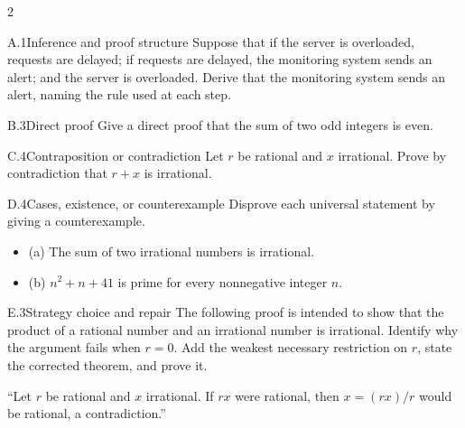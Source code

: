 \documentclass[9pt]{extarticle}
\begin{document}
\begin{multicols}{2}
\begin{CoreProblem}{A.1}{Inference and proof structure}
Suppose that if the server is overloaded, requests are delayed; if requests are
delayed, the monitoring system sends an alert; and the server is overloaded.
Derive that the monitoring system sends an alert, naming the rule used at each
step.
\end{CoreProblem}
\begin{CoreProblem}{B.3}{Direct proof}
Give a direct proof that the sum of two odd integers is even.
\end{CoreProblem}
\begin{CoreProblem}{C.4}{Contraposition or contradiction}
Let $r$ be rational and $x$ irrational. Prove by contradiction that $r+x$ is irrational.
\end{CoreProblem}
\columnbreak
\begin{CoreProblem}{D.4}{Cases, existence, or counterexample}
Disprove each universal statement by giving a counterexample.
\begin{itemize}
  \item (a) The sum of two irrational numbers is irrational.
  \item (b) $n^2+n+41$ is prime for every nonnegative integer $n$.
\end{itemize}
\end{CoreProblem}
\begin{CoreProblem}{E.3}{Strategy choice and repair}
The following proof is intended to show that the product of a rational number
and an irrational number is irrational. Identify why the argument fails when
$r=0$. Add the weakest necessary restriction on $r$, state the corrected
theorem, and prove it.

``Let $r$ be rational and $x$ irrational. If $rx$ were rational, then $x=(rx)/r$ would be rational, a contradiction.''
\end{CoreProblem}
\end{multicols}
\CoreWorkArea
\FormBreak
{}
\end{document}
